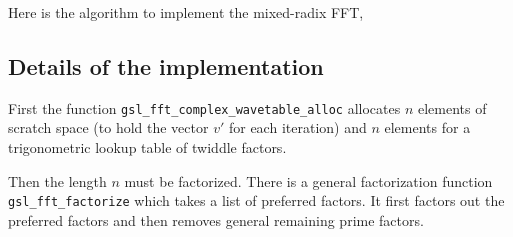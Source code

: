 \documentclass[fleqn,12pt]{article}
\newenvironment{algorithm}{\begin{quote} %
\begin{algorithmic}\samepage}{\end{algorithmic} %
\end{quote}}
\begin{document}
Here is the algorithm to implement the mixed-radix FFT,
%
\begin{algorithm}
\ENDFOR
{}
\ENDFOR
\ENDFOR
\ENDFOR
{}
\ENDFOR
\end{algorithm}
%
\subsection{Details of the implementation}
%
First the function {\tt gsl\_fft\_complex\_wavetable\_alloc} allocates
$n$ elements of scratch space (to hold the vector $v'$ for each
iteration) and $n$ elements for a trigonometric lookup table of
twiddle factors.

Then the length $n$ must be factorized. There is a general
factorization function {\tt gsl\_fft\_factorize} which takes a list of
preferred factors. It first factors out the preferred factors and then
removes general remaining prime factors.
\end{document}
